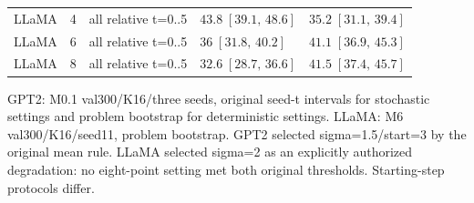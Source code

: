 \begin{table}[t]
{\begin{tabular}{lllll}
LLaMA & 4 & all relative t=0..5 & $43.8\;[39.1,\,48.6]$ & $35.2\;[31.1,\,39.4]$ \\
LLaMA & 6 & all relative t=0..5 & $36\;[31.8,\,40.2]$ & $41.1\;[36.9,\,45.3]$ \\
LLaMA & 8 & all relative t=0..5 & $32.6\;[28.7,\,36.6]$ & $41.5\;[37.4,\,45.7]$ \\
\bottomrule
\end{tabular}}
\par\smallskip\parbox{\textwidth}{\scriptsize GPT2: M0.1 val300/K16/three seeds, original seed-t intervals for stochastic settings and problem bootstrap for deterministic settings. LLaMA: M6 val300/K16/seed11, problem bootstrap. GPT2 selected sigma=1.5/start=3 by the original mean rule. LLaMA selected sigma=2 as an explicitly authorized degradation: no eight-point setting met both original thresholds. Starting-step protocols differ.}
\end{table}
